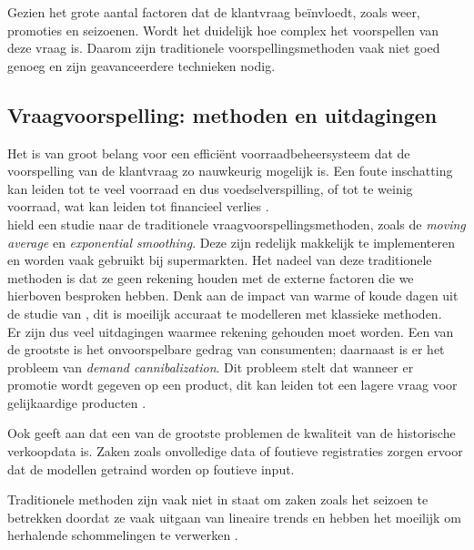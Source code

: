 \documentclass{hogent-article}
\begin{document}
    Gezien het grote aantal factoren dat de klantvraag beïnvloedt, zoals weer, promoties en seizoenen. Wordt het duidelijk hoe complex het voorspellen van deze vraag is. Daarom zijn traditionele voorspellingsmethoden vaak niet goed genoeg en zijn geavanceerdere technieken nodig.\\
    
    \subsection{Vraagvoorspelling: methoden en uitdagingen}
    
    Het is van groot belang voor een efficiënt voorraadbeheersysteem dat de voorspelling van de klantvraag zo nauwkeurig mogelijk is. Een foute inschatting kan leiden tot te veel voorraad en dus voedselverspilling, of tot te weinig voorraad, wat kan leiden tot financieel verlies \autocite{Teller2018a}.\\
    
    \textcite{Chopra2016} hield een studie naar de traditionele vraagvoorspellingsmethoden, zoals de \textit{moving average} en \textit{exponential smoothing}. Deze zijn redelijk makkelijk te implementeren en worden vaak gebruikt bij supermarkten. Het nadeel van deze traditionele methoden is dat ze geen rekening houden met de externe factoren die we hierboven besproken hebben. Denk aan de impact van warme of koude dagen uit de studie van \textcite{Liu2021}, dit is moeilijk accuraat te modelleren met klassieke methoden.\\
    
    Er zijn dus veel uitdagingen waarmee rekening gehouden moet worden. Een van de grootste is het onvoorspelbare gedrag van consumenten; daarnaast is er het probleem van \textit{demand cannibalization}. Dit probleem stelt dat wanneer er promotie wordt gegeven op een product, dit kan leiden tot een lagere vraag voor gelijkaardige producten \autocite{Zhang2017}.
    
    Ook geeft \textcite{Pilarski2024} aan dat een van de grootste problemen de kwaliteit van de historische verkoopdata is. Zaken zoals onvolledige data of foutieve registraties zorgen ervoor dat de modellen getraind worden op foutieve input.
    
    Traditionele methoden zijn vaak niet in staat om zaken zoals het seizoen te betrekken doordat ze vaak uitgaan van lineaire trends en hebben het moeilijk om herhalende schommelingen te verwerken \autocite{Sacks2022}.\\
    
\end{document}
